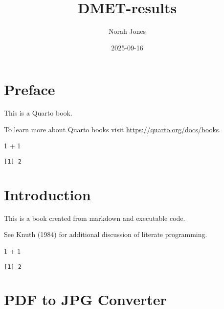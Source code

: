 \documentclass[
  letterpaper,
  DIV=11,
  numbers=noendperiod]{scrreprt}
\title{DMET-results}
\author{Norah Jones}
\date{2025-09-16}
\newenvironment{Shaded}{\begin{snugshade}}{\end{snugshade}}
\newcommand{\DecValTok}[1]{\textcolor[rgb]{0.68,0.00,0.00}{#1}}
\newcommand{\SpecialCharTok}[1]{\textcolor[rgb]{0.37,0.37,0.37}{#1}}
\renewcommand*\contentsname{Table of contents}
\newcommand\contentsname{Table of contents}
\begin{document}
\maketitle

\renewcommand*\contentsname{Table of contents}
{
\hypersetup{linkcolor=}
\setcounter{tocdepth}{2}
\tableofcontents
}


\chapter*{Preface}\label{preface}


This is a Quarto book.

To learn more about Quarto books visit
\url{https://quarto.org/docs/books}.

\begin{Shaded}
\begin{Highlighting}[]
\DecValTok{1} \SpecialCharTok{+} \DecValTok{1}
\end{Highlighting}
\end{Shaded}

\begin{verbatim}
[1] 2
\end{verbatim}


\chapter{Introduction}\label{introduction}

This is a book created from markdown and executable code.

See Knuth (1984) for additional discussion of literate programming.

\begin{Shaded}
\begin{Highlighting}[]
\DecValTok{1} \SpecialCharTok{+} \DecValTok{1}
\end{Highlighting}
\end{Shaded}

\begin{verbatim}
[1] 2
\end{verbatim}


\chapter{PDF to JPG Converter}\label{pdf-to-jpg-converter}
\end{document}
